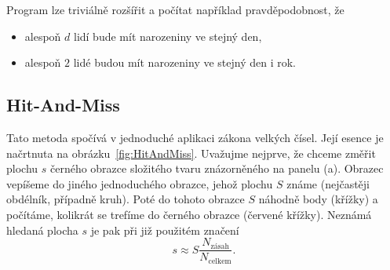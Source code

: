 \documentclass[a4paper,11pt,twoside]{article}
\theoremstyle{red}
\theoremstyle{green}
\begin{document}
\begin{solution}
        Program lze triviálně rozšířit a počítat například pravděpodobnost, že
        \begin{itemize}
            \item alespoň $d$ lidí bude mít narozeniny ve stejný den,
            \item alespoň $2$ lidé budou mít narozeniny ve stejný den i rok.
        \end{itemize}
    \end{solution}

    \subsection{Hit-And-Miss}
        Tato metoda spočívá v jednoduché aplikaci zákona velkých čísel.
        Její esence je načrtnuta na obrázku~\ref{fig:HitAndMiss}.
        Uvažujme nejprve, že chceme změřit plochu $s$ černého obrazce složitého tvaru znázorněného na panelu (a).
        Obrazec vepíšeme do jiného jednoduchého obrazce, jehož plochu $S$ známe (nejčastěji obdélník, případně kruh).
        Poté do tohoto obrazce $S$ náhodně  body (křížky) a počítáme, kolikrát se trefíme do černého obrazce (červené křížky).
        Neznámá hledaná plocha $s$ je pak při již použitém značení
        \begin{equation}
            \label{eq:MCS}
            s\approx S\frac{N_{\text{zásah}}}{N_{\text{celkem}}}.
        \end{equation}
\end{document}
